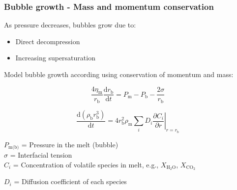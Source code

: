 \documentclass{beamer}
\begin{document}
\begin{frame}
  \frametitle{Bubble growth - Mass and momentum conservation}

  As pressure decreases, bubbles grow due to:

  \begin{itemize}
  \item Direct decompression\\
  \item Increasing supersaturation \\
  \end{itemize}

  Model bubble growth according using conservation of momentum and mass:

  $$ \frac{4 \eta_{\text{m}}}{r_{\text{b}}} \frac{\mathrm{d} r_{\text{b}}}{\mathrm{d} t} = P_{\text{m}} - P_{\text{b}} - \frac{2 \sigma}{r_{\text{b}}} $$

  $$ \frac{\mathrm{d} (\rho_{\text{b}} r_{\text{b}}^{3})}{\mathrm{d} t} = 4 r_{\text{b}}^{2} \rho_{\text{m}} \sum_{i} D_{i} \left. \frac{\partial C_{i}}{\partial r}\right|_{r = r_{\text{b}}}$$

  $P_{\text{m(b)}}$ = Pressure in the melt (bubble) \\

  $\sigma$ = Interfacial tension \\

  $C_{i}$ = Concentration of volatile species in melt, e.g., $X_{\text{H}_{2}\text{O}}$, $X_{\text{CO}_{2}}$

  $D_{i}$ = Diffusion coefficient of each species 

\end{frame}
\end{document}
